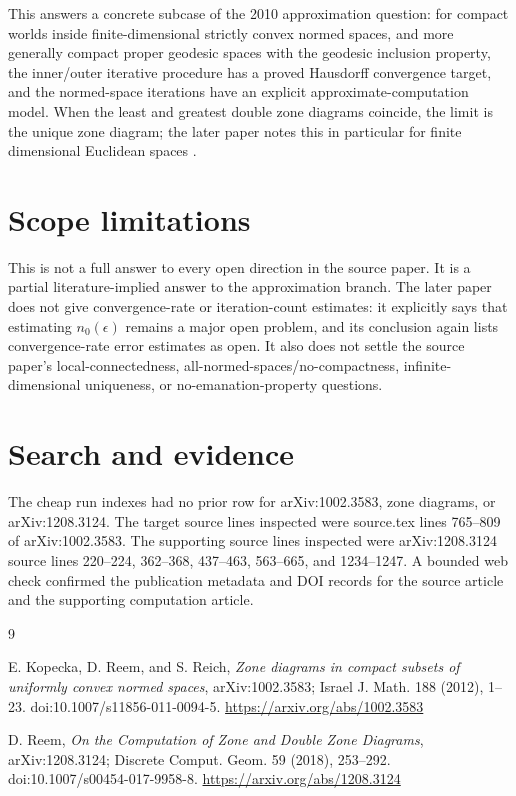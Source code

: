 \documentclass[11pt]{article}
\begin{document}
This answers a concrete subcase of the 2010 approximation question: for compact
worlds inside finite-dimensional strictly convex normed spaces, and more
generally compact proper geodesic spaces with the geodesic inclusion property,
the inner/outer iterative procedure has a proved Hausdorff convergence target,
and the normed-space iterations have an explicit approximate-computation model.
When the least and greatest double zone diagrams coincide, the limit is the
unique zone diagram; the later paper notes this in particular for finite
dimensional Euclidean spaces \cite[Corollary~4.5]{Reem2018}.

\section*{Scope limitations}

This is not a full answer to every open direction in the source paper. It is a
partial literature-implied answer to the approximation branch. The later paper
does not give convergence-rate or iteration-count estimates: it explicitly says
that estimating $n_0(\epsilon)$ remains a major open problem, and its conclusion
again lists convergence-rate error estimates as open. It also does not settle
the source paper's local-connectedness, all-normed-spaces/no-compactness,
infinite-dimensional uniqueness, or no-emanation-property questions.

\section*{Search and evidence}

The cheap run indexes had no prior row for arXiv:1002.3583, zone diagrams, or
arXiv:1208.3124. The target source lines inspected were source.tex lines
765--809 of arXiv:1002.3583. The supporting source lines inspected were
arXiv:1208.3124 source lines 220--224, 362--368, 437--463, 563--665, and
1234--1247. A bounded web check confirmed the publication metadata and DOI
records for the source article and the supporting computation article.

\begin{thebibliography}{9}

E. Kopecka, D. Reem, and S. Reich,
\emph{Zone diagrams in compact subsets of uniformly convex normed spaces},
arXiv:1002.3583; Israel J. Math. 188 (2012), 1--23.
doi:10.1007/s11856-011-0094-5.
\url{https://arxiv.org/abs/1002.3583}

D. Reem,
\emph{On the Computation of Zone and Double Zone Diagrams},
arXiv:1208.3124; Discrete Comput. Geom. 59 (2018), 253--292.
doi:10.1007/s00454-017-9958-8.
\url{https://arxiv.org/abs/1208.3124}

\end{thebibliography}
\end{document}
